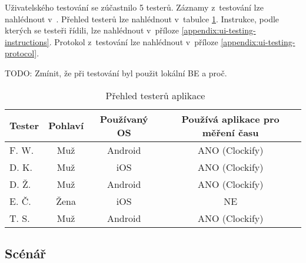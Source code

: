 Uživatelského testování se zúčastnilo 5 testerů. Záznamy z~testování lze nahlédnout v~\cite{ui-testing-playlist}. Přehled testerů lze nahlédnout v~tabulce \ref{table:testers}. Instrukce, podle kterých se testeři řídili, lze nahlédnout v~příloze \ref{appendix:ui-testing-instructions}. Protokol z~testování lze nahlédnout v~příloze \ref{appendix:ui-testing-protocol}.

TODO: Zmínit, že při testování byl použit lokální BE a proč.

\begin{table}\centering
\begin{tabular}{l|c|c|c}
	Tester		& Pohlaví	& Používaný OS	& Používá aplikace pro měření času	\tabularnewline \hline 
 	F. W.		& Muž		& Android       & ANO (Clockify)	                \tabularnewline \hline
	D. K.		& Muž		& iOS	        & ANO (Clockify)                	\tabularnewline \hline
	D. Ž.		& Muž		& Android       & ANO (Clockify)               		\tabularnewline \hline
	E. Č.		& Žena		& iOS	        & NE 	                	        \tabularnewline \hline
	T. S.		& Muž		& Android       & ANO (Clockify)	                \tabularnewline \hline
\end{tabular}
\vspace{0.5cm}
\caption[Přehled testerů aplikace]{~Přehled testerů aplikace}\label{table:testers}
\end{table} 

\subsection{Scénář}

